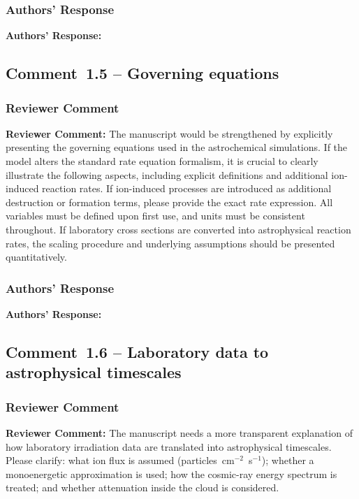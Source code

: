 \documentclass[12pt]{article}
\newcommand{\reviewlabel}{\textbf{\textcolor{commentframe}{Reviewer Comment:}}}
\newcommand{\responselabel}{\textbf{\textcolor{responseframe}{Authors' Response:}}}
\begin{document}
\subsubsection{Authors' Response}
\begin{responsebox}
\responselabel{}

\end{responsebox}

\subsection{Comment~1.5 -- Governing equations}

\subsubsection{Reviewer Comment}
\begin{reviewerbox}
\reviewlabel{} The manuscript would be strengthened by explicitly presenting
the governing equations used in the astrochemical simulations. If the model
alters the standard rate equation formalism, it is crucial to clearly
illustrate the following aspects, including explicit definitions and additional
ion-induced reaction rates. If ion-induced processes are introduced as
additional destruction or formation terms, please provide the exact rate
expression. All variables must be defined upon first use, and units must be
consistent throughout. If laboratory cross sections are converted into
astrophysical reaction rates, the scaling procedure and underlying assumptions
should be presented quantitatively.
\end{reviewerbox}

\subsubsection{Authors' Response}
\begin{responsebox}
\responselabel{}

\end{responsebox}

\subsection{Comment~1.6 -- Laboratory data to astrophysical timescales}

\subsubsection{Reviewer Comment}
\begin{reviewerbox}
\reviewlabel{} The manuscript needs a more transparent explanation of how
laboratory irradiation data are translated into astrophysical timescales.
Please clarify: what ion flux is assumed (particles~cm$^{-2}$~s$^{-1}$);
whether a monoenergetic approximation is used; how the cosmic-ray energy
spectrum is treated; and whether attenuation inside the cloud is considered.
\end{reviewerbox}
\end{document}
